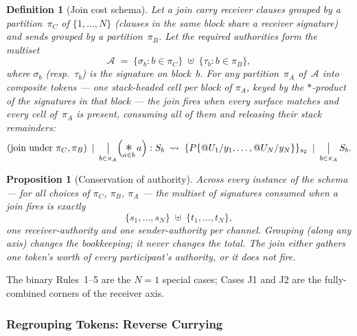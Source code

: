 \documentclass[11pt,a4paper]{article}
\makeatletter
\newtheorem{proposition}[theorem]{Proposition}
\newtheorem{definition}[theorem]{Definition}
\newcommand{\Par}{\mathbin{|}}
\newcommand{\quot}[1]{@#1}
\newcommand{\signed}[2]{\{#1\}_{#2}}
\newcommand{\comp}{\mathbin{*}}
\newcommand{\bigParop}{\mathop{\big|}\displaylimits}
\newcommand{\bigCompop}{\mathop{\text{\Large$\ast$}}\displaylimits}
\newcommand{\red}{\rightsquigarrow}
\makeatother
\begin{document}
\begin{definition}[Join cost schema]
  \label{def:join-schema}
  Let a join carry receiver clauses grouped by a partition~$\pi_C$
  of $\{1,\ldots,N\}$ (clauses in the same block share a receiver
  signature) and sends grouped by a partition~$\pi_B$.  Let the
  required authorities form the multiset
  \[
    \mathcal{A}
    \;=\;
    \{\sigma_b : b \in \pi_C\}
    \;\uplus\;
    \{\tau_b : b \in \pi_B\},
  \]
  where $\sigma_b$ (resp.\ $\tau_b$) is the signature on
  block~$b$.  For \emph{any} partition~$\pi_A$ of~$\mathcal{A}$
  into composite tokens --- one stack-headed cell per block of
  $\pi_A$, keyed by the $\comp$-product of the signatures in
  that block --- the join fires when every surface matches and
  every cell of~$\pi_A$ is present, consuming all of them and
  releasing their stack remainders:
  \[
    (\text{join under } \pi_C, \pi_B)
    \;\Par\;
    \bigParop_{b \in \pi_A}
      \Bigl( \bigCompop_{a \in b} a \Bigr) : S_b
    \;\red\;
    \signed{P\{\quot{U_1}/y_1, \ldots, \quot{U_N}/y_N\}}{s_2}
    \;\Par\;
    \bigParop_{b \in \pi_A} S_b .
  \]
\end{definition}

\begin{proposition}[Conservation of authority]
  \label{prop:join-conservation}
  Across every instance of the schema --- for all choices of
  $\pi_C$, $\pi_B$, $\pi_A$ --- the multiset of signatures
  consumed when a join fires is exactly
  \[
    \{s_1, \ldots, s_N\} \;\uplus\; \{t_1, \ldots, t_N\},
  \]
  one receiver-authority and one sender-authority per channel.
  Grouping (along any axis) changes the bookkeeping; it never
  changes the total.  The join either gathers one token's worth
  of every participant's authority, or it does not fire.
\end{proposition}

\noindent
The binary Rules~1--5 are the $N = 1$ special cases; Cases J1
and J2 are the fully-combined corners of the receiver axis.

\subsubsection{Regrouping Tokens: Reverse Currying}
\end{document}
